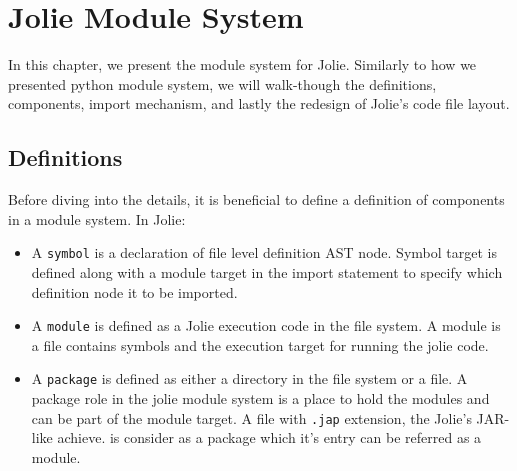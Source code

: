 \chapter{Jolie Module System}

In this chapter, we present the module system for Jolie.
Similarly to how we presented python module system, we will walk-though the definitions, components, import mechanism, and lastly the redesign of Jolie's code file layout.

\section{Definitions}

Before diving into the details, it is beneficial to define a definition of components in a module system. In Jolie:

\begin{itemize}
    \item
          A \texttt{symbol} is a declaration of file level definition AST node. Symbol target is defined along with a module target in the import statement to specify which definition node it to be imported.
    \item
          A \texttt{module} is defined as a Jolie execution code in the file system. A module is a file contains symbols and the execution target for running the jolie code.
    \item
          A \texttt{package} is defined as either a directory in the file system or a file. A package role in the jolie module system is a place to hold the modules and can be part of the module target. A file with \texttt{.jap} extension, the Jolie's JAR-like achieve. is consider as a package which it's entry can be referred as a module.
\end{itemize}











